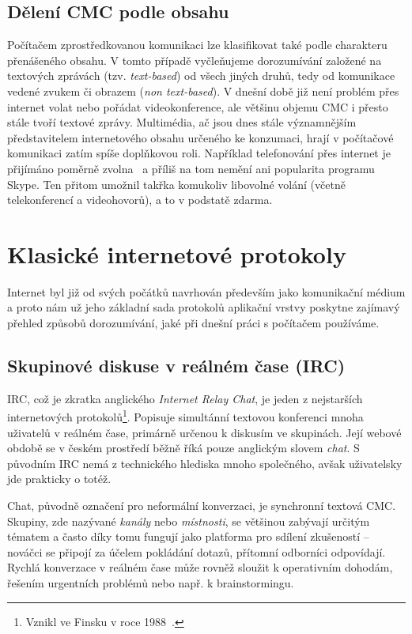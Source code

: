 \documentclass[12pt,oneside,final]{fithesis2}
\begin{document}
\subsection{Dělení CMC podle obsahu}
Počítačem zprostředkovanou komunikaci lze klasifikovat také podle charakteru přenášeného obsahu. V tomto případě vyčleňujeme dorozumívání založené na textových zprávách (tzv. \emph{text-based}) od všech jiných druhů, tedy od komunikace vedené zvukem či obrazem (\emph{non text-based}). V dnešní době již není problém přes internet volat nebo pořádat videokonference, ale většinu objemu CMC i přesto stále tvoří textové zprávy. Multimédia, ač jsou dnes stále významnějším představitelem internetového obsahu určeného ke konzumaci, hrají v počítačové komunikaci zatím spíše doplňkovou roli. Například telefonování přes internet je přijímáno poměrně zvolna~\cite{latif2007adoption} a příliš na tom nemění ani popularita programu Skype. Ten přitom umožnil takřka komukoliv libovolné volání (včetně telekonferencí a videohovorů), a to v podstatě zdarma.


\section{Klasické internetové protokoly}\label{protocols}
Internet byl již od svých počátků navrhován především jako komunikační médium a proto nám už jeho základní sada protokolů aplikační vrstvy poskytne zajímavý přehled způsobů dorozumívání, jaké při dnešní práci s počítačem používáme.

\subsection{Skupinové diskuse v reálném čase (IRC)}\label{irc}
IRC, což je zkratka anglického \emph{Internet Relay Chat}, je jeden z nejstarších internetových protokolů\footnote{Vznikl ve Finsku v roce 1988~\cite{oikarinen2011founding}.}. Popisuje simultánní textovou konferenci mnoha uživatelů v reálném čase, primárně určenou k diskusím ve skupinách. Její webové obdobě se v českém prostředí běžně říká pouze anglickým slovem \emph{chat}. S původním IRC nemá z technického hlediska mnoho společného, avšak uživatelsky jde prakticky o totéž.

Chat, původně označení pro neformální konverzaci, je synchronní textová CMC. Skupiny, zde nazývané \emph{kanály} nebo \emph{místnosti}, se většinou zabývají určitým tématem a často díky tomu fungují jako platforma pro sdílení zkušeností -- nováčci se připojí za účelem pokládání dotazů, přítomní odborníci odpovídají. Rychlá konverzace v reálném čase může rovněž sloužit k operativním dohodám, řešením urgentních problémů nebo např. k brainstormingu.
\end{document}
